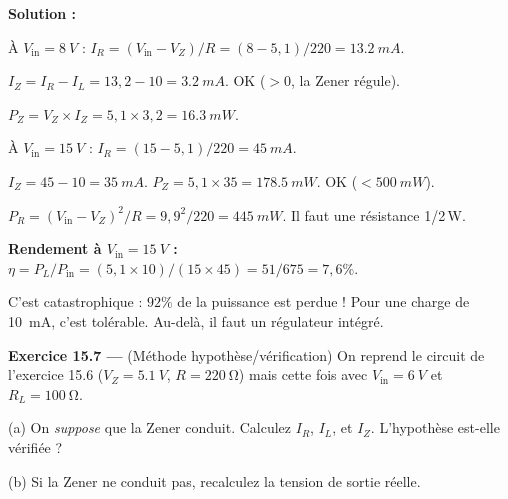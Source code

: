 \documentclass[12pt,a4paper,twoside]{book}
\begin{document}
\begin{pratique}
\textbf{Solution :}

À $V_{\text{in}} = \SI{8}{V}$ : $I_R = (V_{\text{in}} - V_Z)/R = (8-5{,}1)/220 = \SI{13.2}{mA}$.

$I_Z = I_R - I_L = 13{,}2 - 10 = \SI{3.2}{mA}$. OK ($> 0$, la Zener régule).

$P_Z = V_Z \times I_Z = 5{,}1\times3{,}2 = \SI{16.3}{mW}$.

À $V_{\text{in}} = \SI{15}{V}$ : $I_R = (15-5{,}1)/220 = \SI{45}{mA}$.

$I_Z = 45 - 10 = \SI{35}{mA}$. $P_Z = 5{,}1\times35 = \SI{178.5}{mW}$. OK ($< \SI{500}{mW}$).

$P_R = (V_{\text{in}}-V_Z)^2/R = 9{,}9^2/220 = \SI{445}{mW}$. Il faut une résistance 1/2\,W.

\textbf{Rendement à $V_{\text{in}} = \SI{15}{V}$ :} $\eta = P_L/P_{\text{in}} = (5{,}1\times10)/(15\times45) = 51/675 = 7{,}6\%$.

C'est catastrophique : $92\%$ de la puissance est perdue ! Pour une charge de \SI{10}{mA}, c'est tolérable. Au-delà, il faut un régulateur intégré.
\end{pratique}

\textbf{Exercice 15.7 ---} (Méthode hypothèse/vérification) On reprend le circuit de l'exercice 15.6 ($V_Z = \SI{5.1}{V}$, $R = \SI{220}{\ohm}$) mais cette fois avec $V_{\text{in}} = \SI{6}{V}$ et $R_L = \SI{100}{\ohm}$.

(a) On \textit{suppose} que la Zener conduit. Calculez $I_R$, $I_L$, et $I_Z$. L'hypothèse est-elle vérifiée ?

(b) Si la Zener ne conduit pas, recalculez la tension de sortie réelle.
\end{document}
